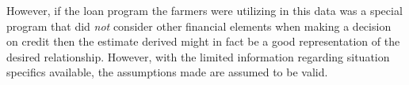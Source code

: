 \documentclass[
]{article}
\begin{document}
However, if the loan program the farmers were utilizing in this data was
a special program that did \emph{not} consider other financial elements
when making a decision on credit then the estimate derived might in fact
be a good representation of the desired relationship. However, with the
limited information regarding situation specifics available, the
assumptions made are assumed to be valid.\\

\hfill\break

\hfill\break
\end{document}
